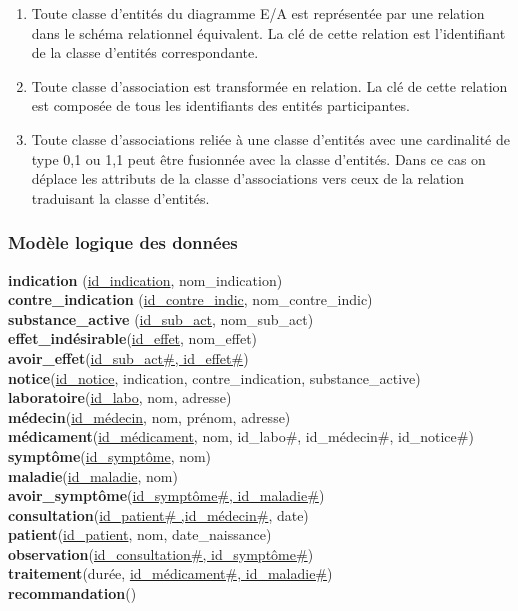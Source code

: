 \documentclass[12pt,a4paper]{article}
\begin{document}
\begin{enumerate}
	
	\item Toute classe d'entités du diagramme E/A est représentée par une relation dans le schéma relationnel	équivalent. La clé de cette relation est l'identifiant de la classe
	d'entités correspondante.
	
	\item Toute classe d'association est transformée en relation. La clé de cette relation est composée de tous les identifiants des entités participantes.
	
	\item Toute classe d'associations reliée à une classe d'entités avec une cardinalité de type 0,1 ou 1,1 peut être fusionnée avec la classe d'entités. Dans ce cas on déplace les attributs de la classe d'associations vers ceux de la relation traduisant la classe d'entités.
	
\end{enumerate}

\subsubsection{Modèle logique des données}

\noindent\textbf{indication} (\underline{id\_indication}, nom\_indication)\\
\textbf{contre\_indication} (\underline{id\_contre\_indic}, nom\_contre\_indic)\\
\textbf{substance\_active} (\underline{id\_sub\_act}, nom\_sub\_act)\\

\noindent\textbf{effet\_indésirable}(\underline{id\_effet}, nom\_effet)\\
\textbf{avoir\_effet}(\underline{id\_sub\_act\#, id\_effet\#})\\
\textbf{notice}(\underline{id\_notice}, indication, contre\_indication, substance\_active)\\
\textbf{laboratoire}(\underline{id\_labo}, nom, adresse)\\
\textbf{médecin}(\underline{id\_médecin}, nom, prénom, adresse)\\
\textbf{médicament}(\underline{id\_médicament}, nom, id\_labo\#, id\_médecin\#, id\_notice\#)\\
\textbf{symptôme}(\underline{id\_symptôme}, nom)\\
\textbf{maladie}(\underline{id\_maladie}, nom)\\
\textbf{avoir\_symptôme}(\underline{id\_symptôme\#, id\_maladie\#})\\
\textbf{consultation}(\underline{id\_patient\# ,id\_médecin\#}, date)\\
\textbf{patient}(\underline{id\_patient}, nom, date\_naissance)\\
\textbf{observation}(\underline{id\_consultation\#, id\_symptôme\#})\\
\textbf{traitement}(durée, \underline{id\_médicament\#, id\_maladie\#})\\
\textbf{recommandation}()
\end{document}
